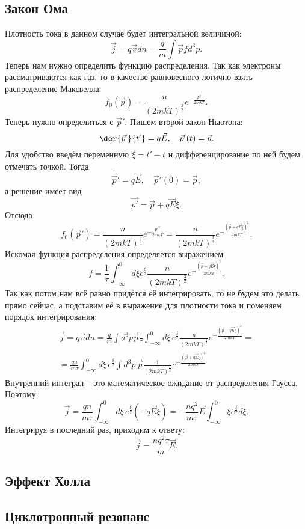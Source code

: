 \subsection{Закон Ома}
Плотность тока в данном случае будет интегральной величиной:
\[
    \vec{j} = q\vec{v}dn = \frac{q}{m}\int\vec{p} f d^3p.
\]
Теперь нам нужно определить функцию распределения. Так как электроны
рассматриваются как газ, то в качестве равновесного логично взять распределение
Максвелла:
\[
    f_0(\vec{p}) = \frac{n}{(2mkT)^\frac{3}{2}}e^{-\frac{p^2}{2mkT}}.
\]
Теперь нужно определиться с \( \vec{p}' \). Пишем второй закон Ньютона:
\[
    \der{\vec{p}'}{t'} = q\vec{E}, \quad \vec{p}'(t) = \vec{p}.
\]
Для удобство введём переменную \( \xi = t' - t \) и дифференцирование по ней
будем отмечать точкой. Тогда
\[
    \dot{\vec{p}'} = q\vec{E}, \quad \vec{p}'(0) = \vec{p},
\]
а решение имеет вид
\[
    \vec{p'} = \vec{p} + q\vec{E}\xi.
\]
Отсюда
\[
    f_0(\vec{p}') = \frac{n}{(2mkT)^\frac{3}{2}}e^{-\frac{{p'}^2}{2mkT}} =
    \frac{n}{(2mkT)^\frac{3}{2}}e^{-\frac{(\vec{p} + q\vec{E}\xi)^2 }{2mkT}}.
\]
Искомая функция распределения определяется выражением
\[
    f = \frac{1}{\tau}\int_{-\infty}^0 d\xi e^\frac{\xi}{\tau}
    \frac{n}{(2mkT)^\frac{3}{2}}e^{-\frac{(\vec{p} + q\vec{E}\xi)^2 }{2mkT}}.
\]
Так как потом нам всё равно придётся её интегрировать, то не будем это делать
прямо сейчас, а подставим её в выражение для плотности тока и поменяем порядок
интегрирования:
\begin{gather*}
    \vec{j} = q\vec{v}dn = \frac{q}{m}\int d^3p \vec{p}
    \frac{1}{\tau}\int_{-\infty}^0 d\xi\, e^\frac{\xi}{\tau}
    \frac{n}{(2mkT)^\frac{3}{2}}e^{-\frac{(\vec{p} + q\vec{E}\xi)^2 }{2mkT}}
    = \\ =
    \frac{qn}{m\tau}
    \int_{-\infty}^0 d\xi\, e^\frac{\xi}{\tau}\int d^3p\, \vec{p}
    \frac{1}{(2mkT)^\frac{3}{2}}e^{-\frac{(\vec{p} + q\vec{E}\xi)^2 }{2mkT}}
\end{gather*}
Внутренний интеграл -- это математическое ожидание от распределения Гаусса.
Поэтому
\[
    \vec{j} = \frac{qn}{m\tau}
    \int_{-\infty}^0 d\xi\, e^\frac{\xi}{\tau} (-q\vec{E}\xi) =
    -\frac{nq^2}{m\tau} \vec{E} \int_{-\infty}^0 \xi e^\frac{\xi}{\tau}d\xi.
\]
Интегрируя в последний раз, приходим к ответу:
\[
    \vec{j} = \frac{nq^2\tau}{m}\vec{E}.
\]
\subsection{Эффект Холла}
\subsection{Циклотронный резонанс}
